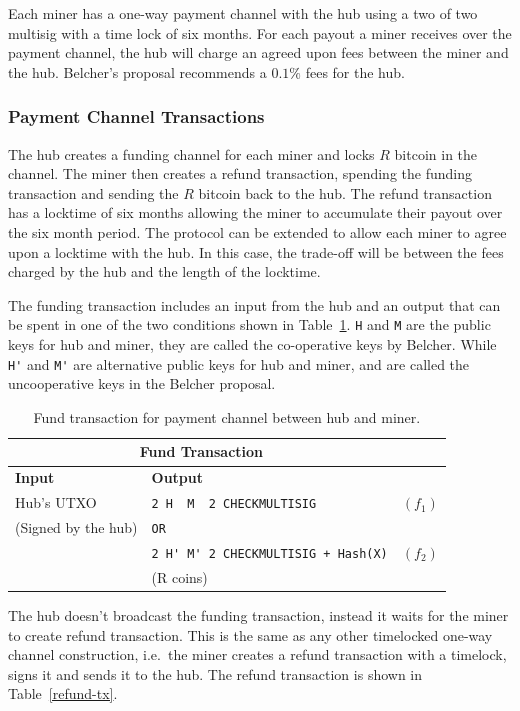 \documentclass{article}
\begin{document}
Each miner has a one-way payment channel with the hub using a two of
two multisig with a time lock of six months. For each payout a miner
receives over the payment channel, the hub will charge an agreed upon
fees between the miner and the hub. Belcher's proposal recommends a
$0.1\%$ fees for the hub.

\subsubsection{Payment Channel Transactions}

The hub creates a funding channel for each miner and locks $R$ bitcoin
in the channel. The miner then creates a refund transaction, spending
the funding transaction and sending the $R$ bitcoin back to the
hub. The refund transaction has a locktime of six months allowing the
miner to accumulate their payout over the six month period. The
protocol can be extended to allow each miner to agree upon a locktime
with the hub. In this case, the trade-off will be between the fees
charged by the hub and the length of the locktime.

The funding transaction includes an input from the hub and an output
that can be spent in one of the two conditions shown in
Table~\ref{fund-tx}. \verb|H| and \verb|M| are the public keys for hub
and miner, they are called the co-operative keys by Belcher. While
\verb|H'| and \verb|M'| are alternative public keys for hub and miner,
and are called the uncooperative keys in the Belcher proposal.


\begin{table}
  \centering
  \begin{tabular}{ llr }
    \multicolumn{2}{c}{\bfseries Fund Transaction} \\
    \midrule
    \bfseries Input & \bfseries Output \\
    \midrule
    Hub's UTXO & \verb|2 H  M  2 CHECKMULTISIG| & $(f_1)$ \\
    (Signed by the hub) & \verb|OR| \\
                    & \verb|2 H' M' 2 CHECKMULTISIG + Hash(X)| & $(f_2)$ \\
    & (R coins) \\
    \midrule
  \end{tabular}
  \caption{Fund transaction for payment channel between hub and miner.}\label{fund-tx}
\end{table}


The hub doesn't broadcast the funding transaction, instead it waits
for the miner to create refund transaction. This is the same as any
other timelocked one-way channel construction, i.e.\ the miner creates
a refund transaction with a timelock, signs it and sends it to the
hub. The refund transaction is shown in Table~\ref{refund-tx}.
\end{document}
